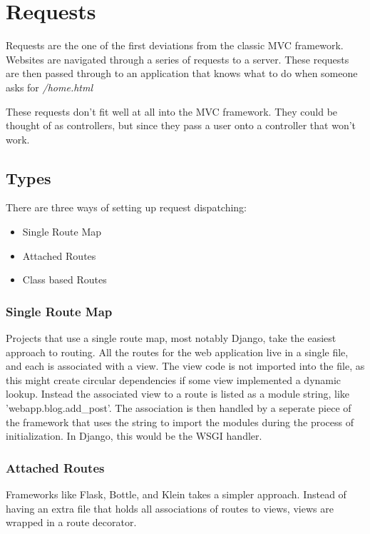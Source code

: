 \chapter{Requests}

Requests are the one of the first deviations from the classic MVC
framework. Websites are navigated through a series of requests to a
server. These requests are then passed through to an application that
knows what to do when someone asks for \emph{/home.html}

These requests don't fit well at all into the MVC framework. They could
be thought of as controllers, but since they pass a user onto a
controller that won't work.

\section{Types}

There are three ways of setting up request dispatching:

\begin{itemize}
    \item Single Route Map
    \item Attached Routes
    \item Class based Routes
\end{itemize}

\subsection{Single Route Map}

Projects that use a single route map, most notably Django, take the
easiest approach to routing. All the routes for the web application live
in a single file, and each is associated with a view. The view code is
not imported into the file, as this might create circular dependencies
if some view implemented a dynamic lookup. Instead the associated view
to a route is listed as a module string, like 'webapp.blog.add_post'.
The association is then handled by a seperate piece of the framework
that uses the string to import the modules during the process of
initialization. In Django, this would be the WSGI handler.

\subsection{Attached Routes}

Frameworks like Flask, Bottle, and Klein takes a simpler approach.
Instead of having an extra file that holds all associations of routes to
views, views are wrapped in a route decorator.

